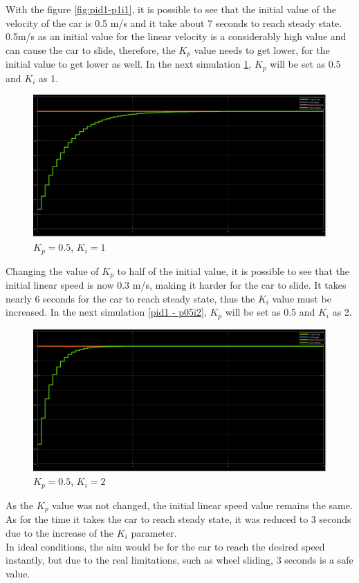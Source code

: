 With the figure \ref{fig:pid1-p1i1}, it is possible to see that the initial value of the velocity of the car is 0.5 m/s and it take about 7 seconds to reach steady state. 0.5m/s as an initial value for the linear velocity is a considerably high value and can cause the car to slide, therefore, the $K_p$ value needs to get lower, for the initial value to get lower as well.
In the next simulation \ref{fig:pid1-p05i1}, $K_p$ will be set as 0.5 and $K_i$ as 1.
\begin{figure}[!h]
\centering
\includegraphics[width=1.0\textwidth]{./img/pid051.png}
\caption {\label{fig:pid1-p05i1}$K_p=0.5$, $K_i=1$}
\end{figure}
Changing the value of $K_p$ to half of the initial value, it is possible to see that the initial linear speed is now 0.3 m/s, making it harder for the car to slide. It takes nearly 6 seconds for the car to reach steady state, thus the $K_i$ value must be increased.
In the next simulation \ref{pid1 - p05i2}, $K_p$ will be set as 0.5 and $K_i$ as 2.
\begin{figure}[!h]
\centering
\includegraphics[width=1.0\textwidth]{./img/pid052.png}
\caption {\label{fig:pid1 - p05i2}$K_p=0.5$, $K_i=2$}
\end{figure}
As the $K_p$ value was not changed, the initial linear speed value remains the same. As for the time it takes the car to reach steady state, it was reduced to 3 seconds due to the increase of the $K_i$ parameter.\\
In ideal conditions, the aim would be for the car to reach the desired speed
instantly, but due to the real limitations, such as wheel sliding, 3 seconds is
a safe value.
%
